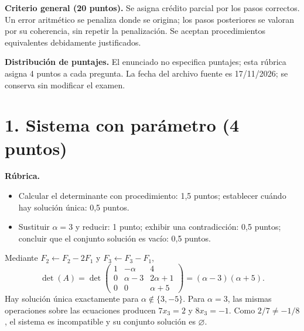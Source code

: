 \documentclass[10pt,a4]{examenEPN0}
\begin{document}
\encabezado
\noindent\textbf{Criterio general (20 puntos).} Se asigna crédito parcial por
los pasos correctos. Un error aritmético se penaliza donde se origina;
los pasos posteriores se valoran por su coherencia, sin repetir la penalización.
Se aceptan procedimientos equivalentes debidamente justificados.
\par\noindent\textbf{Distribución de puntajes.} El enunciado no especifica
puntajes; esta rúbrica asigna 4 puntos a cada pregunta.
La fecha del archivo fuente es 17/11/2026; se conserva sin modificar el examen.

\section*{1. Sistema con parámetro (4 puntos)}
\noindent\textbf{Rúbrica.}
\begin{itemize}[itemsep=2pt]
    \item Calcular el determinante con procedimiento: 1,5 puntos; establecer cuándo hay solución única: 0,5 puntos.
    \item Sustituir $\alpha=3$ y reducir: 1 punto; exhibir una contradicción: 0,5 puntos; concluir que el conjunto solución es vacío: 0,5 puntos.
\end{itemize}
Mediante $F_2\leftarrow F_2-2F_1$ y $F_3\leftarrow F_3-F_1$,
\[
    \det(A)=\det\begin{pmatrix}1&-\alpha&4\\0&\alpha-3&2\alpha+1\\0&0&\alpha+5\end{pmatrix}
    =(\alpha-3)(\alpha+5).
\]
Hay solución única exactamente para $\alpha\notin\{3,-5\}$.
Para $\alpha=3$, las mismas operaciones sobre las ecuaciones producen
$7x_3=2$ y $8x_3=-1$. Como $2/7\ne-1/8$, el sistema es
incompatible y su conjunto solución es $\boxed{\varnothing}$.
\end{document}
